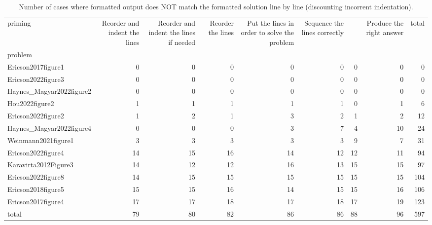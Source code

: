 \begin{table}
\caption{Number of cases where formatted output does NOT match the formatted solution line by line (discounting incorrent indentation).}
\label{tab:pep8-indent-ignored-matches}
\begin{tabular}{lrrrrrrrr}
\toprule
priming & Reorder and indent the lines & Reorder and indent the lines if needed & Reorder the lines & Put the lines in order to solve the problem & Sequence the lines correctly &  & Produce the right answer & total \\
problem &  &  &  &  &  &  &  &  \\
\midrule
Ericson2017figure1 & 0 & 0 & 0 & 0 & 0 & 0 & 0 & 0 \\
Ericson2022figure3 & 0 & 0 & 0 & 0 & 0 & 0 & 0 & 0 \\
Haynes_Magyar2022figure2 & 0 & 0 & 0 & 0 & 0 & 0 & 0 & 0 \\
Hou2022figure2 & 1 & 1 & 1 & 1 & 1 & 0 & 1 & 6 \\
Ericson2022figure2 & 1 & 2 & 1 & 3 & 2 & 1 & 2 & 12 \\
Haynes_Magyar2022figure4 & 0 & 0 & 0 & 3 & 7 & 4 & 10 & 24 \\
Weinmann2021figure1 & 3 & 3 & 3 & 3 & 3 & 9 & 7 & 31 \\
Ericson2022figure4 & 14 & 15 & 16 & 14 & 12 & 12 & 11 & 94 \\
Karavirta2012Figure3 & 14 & 12 & 12 & 16 & 13 & 15 & 15 & 97 \\
Ericson2022figure8 & 14 & 15 & 15 & 15 & 15 & 15 & 15 & 104 \\
Ericson2018figure5 & 15 & 15 & 16 & 14 & 15 & 15 & 16 & 106 \\
Ericson2017figure4 & 17 & 17 & 18 & 17 & 18 & 17 & 19 & 123 \\
total & 79 & 80 & 82 & 86 & 86 & 88 & 96 & 597 \\
\bottomrule
\end{tabular}
\end{table}
